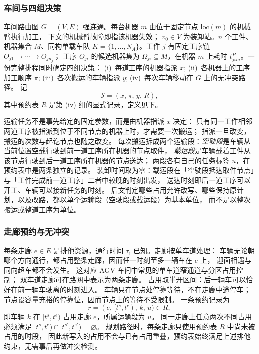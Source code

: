 \documentclass[manuscript,screen,review]{acmart}
\begin{document}
\subsubsection{车间与四组决策}
\label{sec:shop}

车间路由图 \(G=(V,E)\) 强连通。每台机器 \(m\) 由位于固定节点 \(\mathrm{loc}(m)\) 的机械臂执行加工，
下文的机械臂故障即指该机器失效；
\(v_0\in V\) 为装卸站。\(n\) 个工件、机器集合 \(M\)、同构单载车队
\(K=\{1,\ldots,N_A\}\)。工件 \(j\) 有固定工序链 \(O_{j1}\to\cdots\to O_{jn_j}\)；
工序 \(O_{ji}\) 的候选机器集为 \(\Omega_{ji}\subseteq M\)，在机器 \(m\) 上耗时
\(t^P_{jim}\)。一份完整排程同时确定四组决策：
(i)~每道工序的机器指派 \(x\);
(ii)~各机器上的工序加工顺序 \(\pi\);
(iii)~各次搬运的车辆指派 \(y\);
(iv)~每次车辆移动在 \(G\) 上的无冲突路径。
记
\[
\mathcal{S}=(x,\,\pi,\,y,\,R),
\]
其中预约表 \(R\) 是第 (iv) 组的显式记录，定义见下。

运输任务不是事先给定的固定参数，而是由机器指派 \(x\) 决定：
只有同一工件相邻两道工序被指派到位于不同节点的机器上时，才需要一次搬运；
指派一旦改变，搬运的次数与起讫节点也随之改变。
每次搬运拆成两个运输段：\emph{空驶段}是车辆从当前位置空载行驶到前一道工序所在机器的节点取件，
\emph{载运段}是车辆载着工件从该节点行驶到后一道工序所在机器的节点送达；
两段各有自己的任务标签 \(u\)，在预约表中是两条独立的记录。
装卸时间取为零：载运段在「空驶段抵达取件节点」与「工件完成前一道工序」二者中较晚的时刻出发，
送达时刻即后一道工序可以开工、车辆可以接新任务的时刻。
后文判定哪些占用允许改写、哪些保持原计划，以及改路，都以单个运输段（空驶段或载运段）为基本单位，
而不是以整次搬运或整道工序为单位。

\subsubsection{走廊预约与无冲突}
\label{sec:reservation}

每条走廊 \(e\in E\) 是排他资源，通行时间 \(\tau_e\) 已知。走廊按单车道处理：
车辆无论朝哪个方向通行，都占用整条走廊，因而任一时刻至多一辆车在 \(e\) 上，
迎面相遇与同向超车都不会发生。
这对应 AGV 车间中常见的单车道窄通道与分区占用控制；
双车道走廊可在路网中表示为两条走廊。
占用取半开区间：后一辆车可以恰好在前一辆车驶离的时刻进入。
车辆只在节点处停靠等待，不在走廊中途停车；节点设容量充裕的停靠位，因而节点上的等待不受限制。
一条预约记录为
\[
r=(e,\,[t^s,t^e),\,k,\,u)\in R,
\]
即车辆 \(k\) 在 \([t^s,t^e)\) 占用走廊 \(e\)，所属运输段为 \(u\)。
同一走廊上任意两次不同占用必须满足
\([t^s,t^e)\cap[t^{s\prime},t^{e\prime})=\varnothing\)。
规划路径时，每条走廊只使用预约表 \(R\) 中尚未被占用的时段，
因此新写入的占用不会与已有占用重叠，预约表始终满足上述排他约束，无需事后再做冲突检测。
\end{document}
